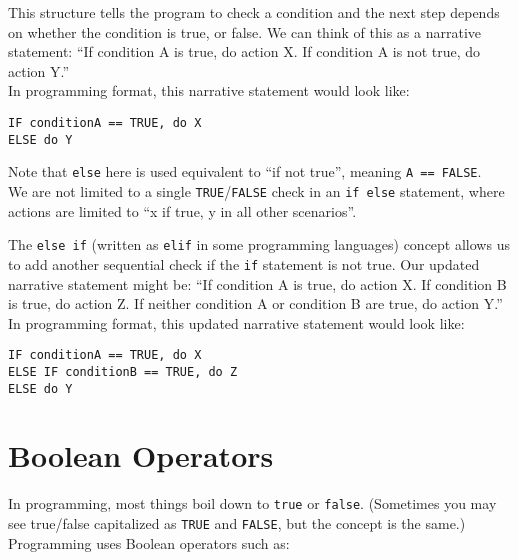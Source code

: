 \documentclass[
]{book}
\begin{document}
This structure tells the program to check a condition and the next step depends on whether the condition is true, or false. We can think of this as a narrative statement: ``If condition A is true, do action X. If condition A is not true, do action Y.''\\

In programming format, this narrative statement would look like:

\begin{verbatim}
IF conditionA == TRUE, do X
ELSE do Y
\end{verbatim}

Note that \texttt{else} here is used equivalent to ``if not true'', meaning \texttt{A\ ==\ FALSE}.\\

We are not limited to a single \texttt{TRUE}/\texttt{FALSE} check in an \texttt{if\ else} statement, where actions are limited to ``x if true, y in all other scenarios''.

The \texttt{else\ if} (written as \texttt{elif} in some programming languages) concept allows us to add another sequential check if the \texttt{if} statement is not true. Our updated narrative statement might be: ``If condition A is true, do action X. If condition B is true, do action Z. If neither condition A or condition B are true, do action Y.''\\

In programming format, this updated narrative statement would look like:

\begin{verbatim}
IF conditionA == TRUE, do X
ELSE IF conditionB == TRUE, do Z
ELSE do Y
\end{verbatim}

\section{Boolean Operators}\label{boolean-operators}

In programming, most things boil down to \texttt{true} or \texttt{false}. (Sometimes you may see true/false capitalized as \texttt{TRUE} and \texttt{FALSE}, but the concept is the same.)\\

Programming uses Boolean operators such as:\\
\end{document}
